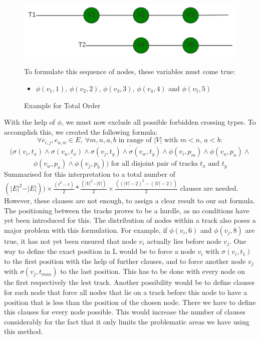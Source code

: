 \documentclass[bachelor, english]{algothesis}
\begin{document}
\begin{figure}[ht]
  \centering
  \begin{minipage}{0.6\textwidth}
    \includegraphics[width=\linewidth]{figures/Order_example.png}
  \caption{Example for Total Order}
  \label{fig:order_example_tot}
  \end{minipage}%
  \begin{minipage}{0.4\textwidth}
    To formulate this sequence of nodes, these variables must come true:
    \begin{itemize}
    \item  $\phi(v_1,1)$, $\phi(v_2,2)$, $\phi(v_3,3)$, $\phi(v_4,4)$ and $\phi(v_5,5)$
    \end{itemize}
  \end{minipage}
\end{figure}
\noindent
With the help of $\phi$, we must now exclude all possible forbidden crossing types.
To accomplish this, we created the following formula:
    $$ \forall e_{i,j}, e_{u,w} \in E, \ \forall m,n,a,b \text{ in range of } \vert V \vert \text{ with } m<n, \, a<b:$$
    $$\overline{(\sigma(v_i,t_x) \land \sigma(v_u,t_x) \land \sigma(v_j,t_y) \land \sigma(v_w,t_y) \land \phi(v_i,p_m) \land \phi(v_u,p_n) \land}$$
    $$ \overline{\phi(v_w,p_a) \land \phi(v_j,p_b))}\text{ for all disjoint pair of tracks } t_x \text{ and } t_y $$
Summarised for this interpretation to a total number of
$ (\vert E \vert^2 - \vert E \vert)) \times \frac{(t^2-t)}{2} * \frac{(\vert V \vert^2-\vert V \vert)}{2} \times \frac{((\vert V \vert-2)^2-(\vert V \vert-2))}{2}$ clauses are needed. However, these clauses are not enough,
to assign a clear result to our sat formula. The positioning between the tracks proves to be a hurdle, as no conditions have yet been introduced for this. The distribution of nodes within a track also poses a major problem with this formulation. For example, if $\phi(v_i,6)$ and $\phi(v_j,8)$ are true, it has not yet been ensured that node $v_i$ actually lies before node $v_j$. One way to define the exact position in L would be to force a node $v_i$ with $\sigma(v_i,t_1)$ to the first position with the help of further clauses, and to force another node $v_j$ with $\sigma(v_j,t_{max})$ to the last position. This has to be done with every node on the first respectively the lest track. Another possibility would be to define clauses for each node that force all nodes that lie on a track before this node to have a position that is less than the position of the chosen node. There we have to define this clauses for every node possible. This would increase the number of clauses considerably for the fact that it only limits the problematic areas we have using this method.
\end{document}
